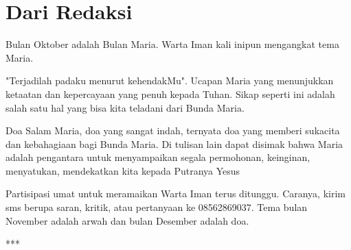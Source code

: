 \newpage

\chapter*{Dari Redaksi}

Bulan Oktober adalah Bulan Maria. Warta Iman kali inipun mengangkat tema Maria.

\bigskip
"Terjadilah padaku menurut kehendakMu". Ucapan Maria yang menunjukkan ketaatan dan kepercayaan yang penuh kepada Tuhan. Sikap seperti ini adalah salah satu hal yang bisa kita teladani dari Bunda Maria.  

\bigskip
Doa Salam Maria, doa yang sangat indah, ternyata doa yang memberi sukacita dan kebahagiaan bagi Bunda Maria. 
Di tulisan lain dapat disimak bahwa Maria adalah pengantara untuk menyampaikan segala permohonan, keinginan, menyatukan, mendekatkan kita kepada Putranya Yesus


\bigskip
Partisipasi umat untuk meramaikan Warta Iman terus ditunggu. Caranya, kirim sms berupa saran, kritik, atau pertanyaan ke 08562869037. Tema bulan November adalah arwah dan bulan Desember adalah doa. 
\normalsize

\begin{center}***\end{center} 

\vfill

\footnotesize
{}
\normalsize

